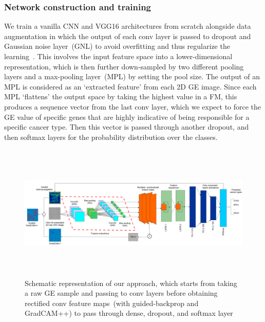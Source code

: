 \subsubsection{Network construction and training}
We train a vanilla CNN and VGG16 architectures from scratch alongside data augmentation in which the output of each conv layer is passed to dropout and Gaussian noise layer~(GNL) to avoid overfitting and thus regularize the learning~\cite{vardropout}. This involves the input feature space into a lower-dimensional representation, which is then further down-sampled by two different pooling layers and a max-pooling layer~(MPL) by setting the pool size. The output of an MPL is considered as an `extracted feature' from each 2D GE image. Since each MPL `flattens' the output space by taking the highest value in a FM, this produces a sequence vector from the last conv layer, which we expect to force the GE value of specific genes that are highly indicative of being responsible for a specific cancer type. Then this vector is passed through another dropout, and then softmax layers for the probability distribution over the classes.

\begin{figure}[h]
	\centering
	\includegraphics[width=\textwidth,height=65mm]{images/clstm.png}
    \caption{Schematic representation of our approach, which starts from taking a raw GE sample and passing to conv layers before obtaining rectified conv feature maps~(with guided-backprop and GradCAM++) to pass through dense, dropout, and softmax layer}	
	\label{fig:clstm}
\end{figure}

